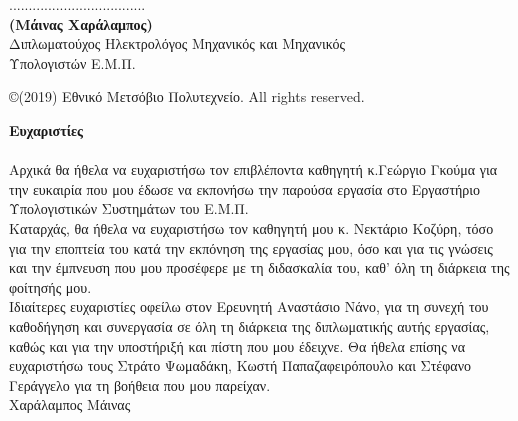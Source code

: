 \documentclass[12pt, twoside, a4paper]{report}
\begin{document}
\vspace{30ex}
\noindent
................................... \\
\textbf{(Μάινας Χαράλαμπος)} \\
Διπλωματούχος Ηλεκτρολόγος Μηχανικός και Μηχανικός \\Υπολογιστών Ε.Μ.Π. \\
\vspace{8ex}


\small
\noindent
\copyright \hspace{1em}(2019) Εθνικό Μετσόβιο Πολυτεχνείο.
All rights reserved.



\newpage
\thispagestyle{empty}
\mbox{}
\newpage
\thispagestyle{empty}
\noindent
\vspace{3ex}
\textbf {\Large{Ευχαριστίες}} \\ \\
Αρχικά θα ήθελα να ευχαριστήσω τον επιβλέποντα καθηγητή κ.Γεώργιο Γκούμα για την
ευκαιρία που μου έδωσε να εκπονήσω την παρούσα εργασία στο Εργαστήριο
Υπολογιστικών Συστημάτων του Ε.Μ.Π. \\

\noindent
Καταρχάς, θα ήθελα να ευχαριστήσω τον καθηγητή μου κ. Νεκτάριο Κοζύρη, τόσο για την εποπτεία του κατά την εκπόνηση της εργασίας μου, όσο και για τις γνώσεις και την έμπνευση που μου προσέφερε με τη διδασκαλία του, καθ' όλη τη διάρκεια της φοίτησής μου. \\

\noindent
Ιδιαίτερες ευχαριστίες οφείλω στον Ερευνητή Αναστάσιο Νάνο, για τη συνεχή του
καθοδήγηση και συνεργασία σε όλη τη διάρκεια της διπλωματικής αυτής εργασίας,
καθώς και για την υποστήριξή και πίστη που μου έδειχνε. Θα ήθελα επίσης να
ευχαριστήσω τους Στράτο Ψωμαδάκη, Κωστή Παπαζαφειρόπουλο και Στέφανο Γεράγγελο
για τη βοήθεια που μου παρείχαν. \\

\hfill
Χαράλαμπος Μάινας
\newpage
\thispagestyle{empty}
\mbox{}
\newpage

\setcounter{page}{1}
\tableofcontents
\newpage
\listoffigures












{}
\end{document}
